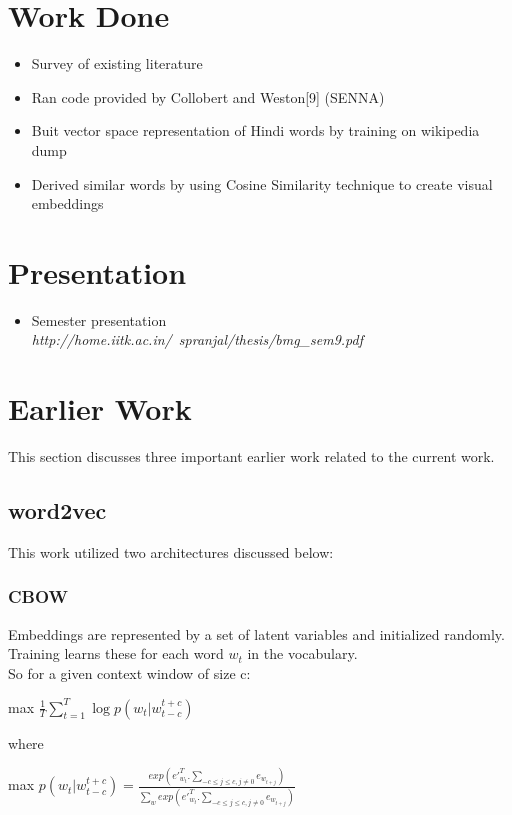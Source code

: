 \documentclass{article}
\begin{document}
\section{Work Done}
\begin{itemize}
\item Survey of existing literature
\item Ran code provided by Collobert and Weston[9] (SENNA)
\item Buit vector space representation of Hindi words by training on wikipedia dump
\item Derived similar words by using Cosine Similarity technique to create visual embeddings
\end{itemize}

\section{Presentation}
\begin{itemize}
\item Semester presentation\\
\emph{http://home.iitk.ac.in/~spranjal/thesis/bmg\_sem9.pdf}
\end{itemize}

\section{Earlier Work}
This section discusses three important earlier work related to the current work.
\subsection{word2vec}
This work utilized two architectures discussed below:
\subsubsection{CBOW}
Embeddings are represented by a set of latent variables and initialized randomly. Training learns these for each word $w_t$ in the vocabulary.\\
So for a given context window of size c:
\begin{center} max $ \frac{1}{T}\sum_{t=1}^T \log p(w_t | w_{t-c}^{t+c}) $  \end{center}
where
\begin{center} max $ p(w_t | w_{t-c}^{t+c}) = \frac{exp({e'}_{w_t}^{T}.\sum_{-c \leq j \leq c,j\neq 0}e_{w_{t+j}})}{\sum_{w} exp({e'}_{w_t}^{T}.\sum_{-c \leq j \leq c,j\neq 0}e_{w_{t+j}})} $  \end{center}
\end{document}
